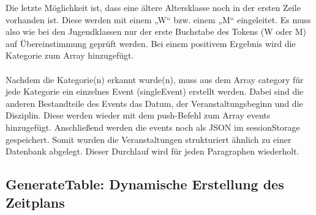 {Die letzte Möglichkeit ist, dass eine ältere Altersklasse noch in der ersten Zeile vorhanden ist. Diese werden mit einem „W“ bzw. einem „M“ eingeleitet. Es muss also wie bei den Jugendklassen nur der erste Buchstabe des Tokens (W oder M) auf Übereinstimmung geprüft werden. Bei einem positivem Ergebnis wird die Kategorie zum Array hinzugefügt.\\
\\
Nachdem die Kategorie(n) erkannt wurde(n), muss aus dem Array category für jede Kategorie ein einzelnes Event (singleEvent) erstellt werden. Dabei sind die anderen Bestandteile des Events das Datum, der Veranstaltungsbeginn und die Disziplin. Diese werden wieder mit dem push-Befehl zum Array events hinzugefügt. Anschließend werden die events noch als JSON im sessionStorage gespeichert. Somit wurden die Veranstaltungen strukturiert ähnlich zu einer Datenbank abgelegt.
Dieser Durchlauf wird für jeden Paragraphen wiederholt. 

\subsection{GenerateTable: Dynamische Erstellung des Zeitplans}

}
